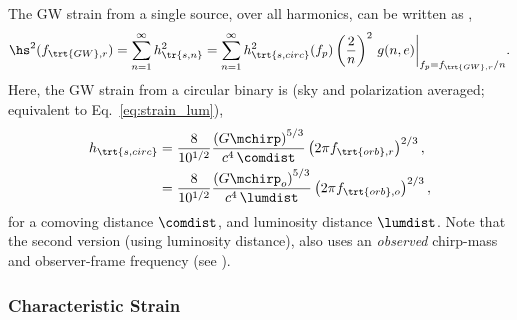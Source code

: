 \documentclass[10pt, oneside, onecolumn]{article}   	%
\newcommand{\hsn}{h_\tr{s,n}}
\newcommand{\hscirc}{h_\trt{s,circ}}
\newcommand{\frstgw}{f_{\trt{GW},r}}
\newcommand{\frstorb}{f_{\trt{orb},r}}
\newcommand{\fobsorb}{f_{\trt{orb},o}}
\begin{document}
            The GW strain from a single source, over all harmonics, can be written as \citep[][Eq.~9]{amaro-seoane2010},
            \begin{equation}
                \label{eq:gw_strain_instant}
                \hs^2(\frstgw) = \sum_{n=1}^\infty \hsn^2 = \sum_{n=1}^\infty \hscirc^2(f_p) \left(\frac{2}{n}\right)^2 \, g(n,e) \bigg|_{f_p = \frstgw/n}.
            \end{equation}
            Here, the GW strain from a circular binary is \citep[][Eq.~7]{sesana2008} (sky and polarization averaged; equivalent to Eq.~\ref{eq:strain_lum}),
            \begin{equation}
            \begin{split}
                \label{eq:gw_strain_amp_circ}
                \hscirc
                    & = \frac{8}{10^{1/2}} \frac{\left(G\mchirp\right)^{5/3}}{c^4 \, \comdist} \left(2 \pi \frstorb \right)^{2/3}, \\
                    & = \frac{8}{10^{1/2}} \frac{\left(G\mchirp_o\right)^{5/3}}{c^4 \, \lumdist} \left(2 \pi \fobsorb \right)^{2/3},
            \end{split}
            \end{equation}
            for a comoving distance $\comdist$, and luminosity distance $\lumdist$.  Note that the second version (using luminosity distance), also uses an \textit{observed} chirp-mass and observer-frame frequency (see ).

            \subsubsection{Characteristic Strain }
\end{document}
